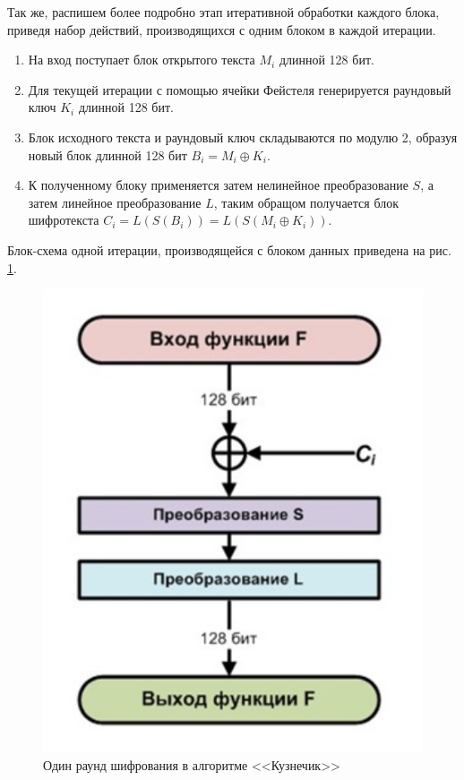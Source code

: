 \documentclass[a4paper, 12pt]{article}
\begin{document}
    Так же, распишем более подробно этап итеративной обработки каждого блока, приведя
    набор действий, производящихся с одним блоком в каждой итерации.

    \begin{enumerate}
        \item На вход поступает блок открытого текста $M_i$ длинной 128 бит.
        \item Для текущей итерации с помощью ячейки Фейстеля генерируется раундовый ключ $K_i$ длинной 128 бит.
        \item Блок исходного текста и раундовый ключ складываются по модулю 2, образуя новый блок длинной 128 бит $B_i = M_i \oplus K_i$.
        \item К полученному блоку применяется затем нелинейное преобразование $S$, а затем линейное преобразование $L$, таким обращом получается блок шифротекста $C_i = L(S(B_i)) = L(S(M_i \oplus K_i))$.
    \end{enumerate}

    Блок-схема одной итерации, производящейся с блоком данных приведена на рис. \ref{fig:AlgorithBlockScheme}.

    \begin{figure}
        \centering
        \includegraphics{images/AlgorithBlockScheme.png}
        \caption{Один раунд шифрования в алгоритме <<Кузнечик>>}
        \label{fig:AlgorithBlockScheme}
    \end{figure}
\end{document}
